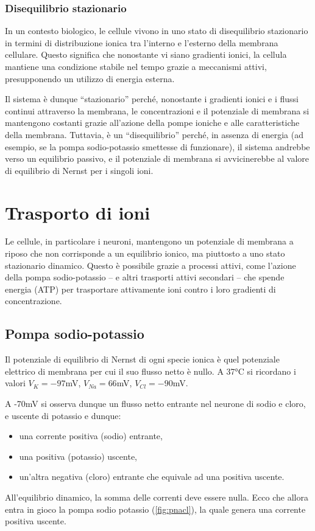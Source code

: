 \subsubsection{Disequilibrio stazionario}
In un contesto biologico, le cellule vivono in uno stato di disequilibrio stazionario in termini di distribuzione ionica tra l'interno e l'esterno della membrana cellulare. Questo significa che nonostante vi siano gradienti ionici, la cellula mantiene una condizione stabile nel tempo grazie a meccanismi attivi, presupponendo un utilizzo di energia esterna.

Il sistema è dunque ``stazionario'' perché, nonostante i gradienti ionici e i flussi continui attraverso la membrana, le concentrazioni e il potenziale di membrana si mantengono costanti grazie all'azione della pompe ioniche e alle caratteristiche della membrana. Tuttavia, è un ``disequilibrio'' perché, in assenza di energia (ad esempio, se la pompa sodio-potassio smettesse di funzionare), il sistema andrebbe verso un equilibrio passivo, e il potenziale di membrana si avvicinerebbe al valore di equilibrio di Nernst per i singoli ioni.

\section{Trasporto di ioni}
Le cellule, in particolare i neuroni, mantengono un potenziale di membrana a riposo che non corrisponde a un equilibrio ionico, ma piuttosto a uno stato stazionario dinamico. Questo è possibile grazie a processi attivi, come l'azione della pompa sodio-potassio -- e altri trasporti attivi secondari -- che spende energia (ATP) per trasportare attivamente ioni contro i loro gradienti di concentrazione.

\subsection{Pompa sodio-potassio}
Il potenziale di equilibrio di Nernst di ogni specie ionica è quel potenziale elettrico di membrana per cui il suo flusso netto è nullo. A 37°C si ricordano i valori $V_K= -97$mV, $V_{Na} = 66$mV, $V_{Cl} = -90$mV.

A -70mV si osserva dunque un flusso netto entrante nel neurone di sodio e cloro, e uscente di potassio e dunque:
\begin{itemize}
    \item una corrente positiva (sodio) entrante,
    \item una positiva (potassio) uscente,
    \item un'altra negativa (cloro) entrante che equivale ad una positiva uscente.
\end{itemize}
All'equilibrio dinamico, la somma delle correnti deve essere nulla. Ecco che allora entra in gioco la pompa sodio potassio (\autoref{fig:pnacl}), la quale genera una corrente positiva uscente.

